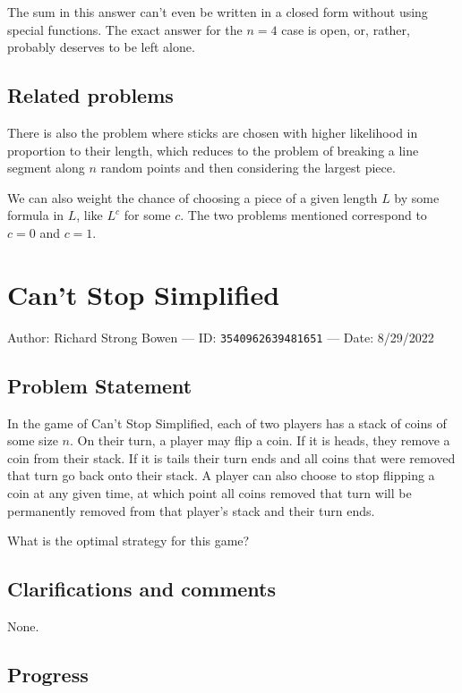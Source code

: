 \documentclass[10pt]{article}
\begin{document}
The sum in this answer can't even be written in a closed form without using special functions. The exact answer for the $n=4$ case is open, or, rather, probably deserves to be left alone.

\subsection{Related problems}

There is also the problem where sticks are chosen with higher likelihood in proportion to their length, which reduces to the problem of breaking a line segment along $n$ random points and then considering the largest piece.

We can also weight the chance of choosing a piece of a given length $L$ by some formula in $L$, like $L^c$ for some $c$. The two problems mentioned correspond to $c=0$ and $c=1$.

\pagebreak

\section{Can't Stop Simplified}

Author: Richard Strong Bowen --- ID: \verb`3540962639481651` --- Date: 8/29/2022

\subsection{Problem Statement}

In the game of Can't Stop Simplified, each of two players has a stack of coins of some size $n$. On their turn, a player may flip a coin. If it is heads, they remove a coin from their stack. If it is tails their turn ends and all coins that were removed that turn go back onto their stack. A player can also choose to stop flipping a coin at any given time, at which point all coins removed that turn will be permanently removed from that player's stack and their turn ends.

What is the optimal strategy for this game?

\subsection{Clarifications and comments}

None.

\subsection{Progress}
\end{document}
